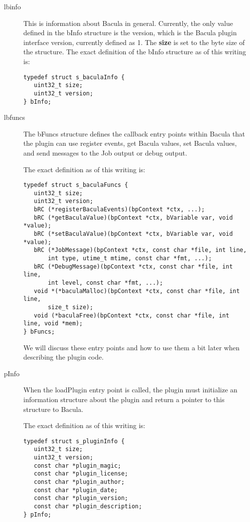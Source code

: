 \begin{description}
\item [lbinfo]
This is information about Bacula in general. Currently, the only value
defined in the bInfo structure is the version, which is the Bacula plugin 
interface version, currently defined as 1.  The {\bf size} is set to the
byte size of the structure. The exact definition of the bInfo structure
as of this writing is: 

\begin{verbatim}
typedef struct s_baculaInfo {
   uint32_t size;
   uint32_t version;
} bInfo;
\end{verbatim}

\item [lbfuncs]
The bFuncs structure defines the callback entry points within Bacula
that the plugin can use register events, get Bacula values, set
Bacula values, and send messages to the Job output or debug output.

The exact definition as of this writing is:
\begin{verbatim}
typedef struct s_baculaFuncs {
   uint32_t size;
   uint32_t version;
   bRC (*registerBaculaEvents)(bpContext *ctx, ...);
   bRC (*getBaculaValue)(bpContext *ctx, bVariable var, void *value);
   bRC (*setBaculaValue)(bpContext *ctx, bVariable var, void *value);
   bRC (*JobMessage)(bpContext *ctx, const char *file, int line,
       int type, utime_t mtime, const char *fmt, ...);
   bRC (*DebugMessage)(bpContext *ctx, const char *file, int line,
       int level, const char *fmt, ...);
   void *(*baculaMalloc)(bpContext *ctx, const char *file, int line,
       size_t size);
   void (*baculaFree)(bpContext *ctx, const char *file, int line, void *mem);
} bFuncs;
\end{verbatim}

We will discuss these entry points and how to use them a bit later when
describing the plugin code.


\item [pInfo]
When the loadPlugin entry point is called, the plugin must initialize
an information structure about the plugin and return a pointer to
this structure to Bacula.

The exact definition as of this writing is:

\begin{verbatim}
typedef struct s_pluginInfo {
   uint32_t size;
   uint32_t version;
   const char *plugin_magic;
   const char *plugin_license;
   const char *plugin_author;
   const char *plugin_date;
   const char *plugin_version;
   const char *plugin_description;
} pInfo;
\end{verbatim}


\end{description}
